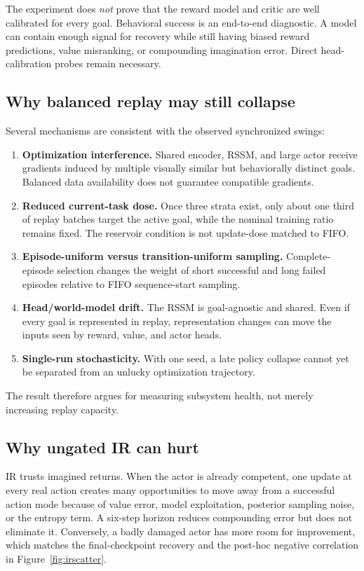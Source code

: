 \documentclass[10pt]{article}
\begin{document}
The experiment does \emph{not} prove that the reward model and critic are well calibrated for every goal. Behavioral success is an end-to-end diagnostic. A model can contain enough signal for recovery while still having biased reward predictions, value misranking, or compounding imagination error. Direct head-calibration probes remain necessary.

\subsection{Why balanced replay may still collapse}

Several mechanisms are consistent with the observed synchronized swings:
\begin{enumerate}
  \item \textbf{Optimization interference.} Shared encoder, RSSM, and large actor receive gradients induced by multiple visually similar but behaviorally distinct goals. Balanced data availability does not guarantee compatible gradients.
  \item \textbf{Reduced current-task dose.} Once three strata exist, only about one third of replay batches target the active goal, while the nominal training ratio remains fixed. The reservoir condition is not update-dose matched to FIFO.
  \item \textbf{Episode-uniform versus transition-uniform sampling.} Complete-episode selection changes the weight of short successful and long failed episodes relative to FIFO sequence-start sampling.
  \item \textbf{Head/world-model drift.} The RSSM is goal-agnostic and shared. Even if every goal is represented in replay, representation changes can move the inputs seen by reward, value, and actor heads.
  \item \textbf{Single-run stochasticity.} With one seed, a late policy collapse cannot yet be separated from an unlucky optimization trajectory.
\end{enumerate}

The result therefore argues for measuring subsystem health, not merely increasing replay capacity.

\subsection{Why ungated IR can hurt}

IR trusts imagined returns. When the actor is already competent, one update at every real action creates many opportunities to move away from a successful action mode because of value error, model exploitation, posterior sampling noise, or the entropy term. A six-step horizon reduces compounding error but does not eliminate it. Conversely, a badly damaged actor has more room for improvement, which matches the final-checkpoint recovery and the post-hoc negative correlation in Figure~\ref{fig:irscatter}.
\end{document}
